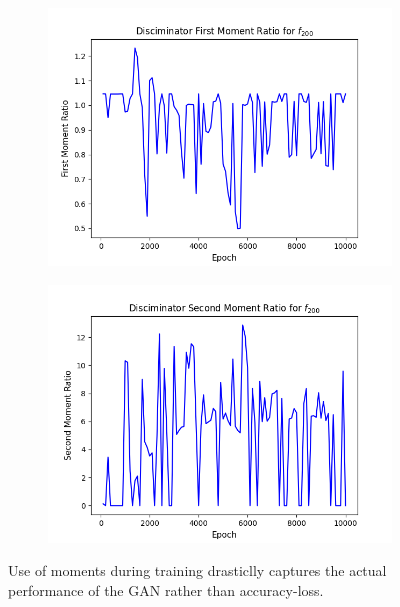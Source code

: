 \documentclass[11pt]{article} %
\begin{document}
\begin{figure}[H]
\begin{minipage}{\textwidth}
\begin{subfigure}{.5\textwidth}
      \includegraphics[scale=0.5]{./images/moment_1_f200like.png}
  \end{subfigure}
  \begin{subfigure}{.5\textwidth}
      \includegraphics[scale=0.5]{./images/moment_2_f200like.png}
  \end{subfigure}
\end{minipage}
\caption{Use of moments during training drasticlly captures the actual performance of the GAN rather than accuracy-loss.}
\label{fig:moments}
\end{figure}
\end{document}
